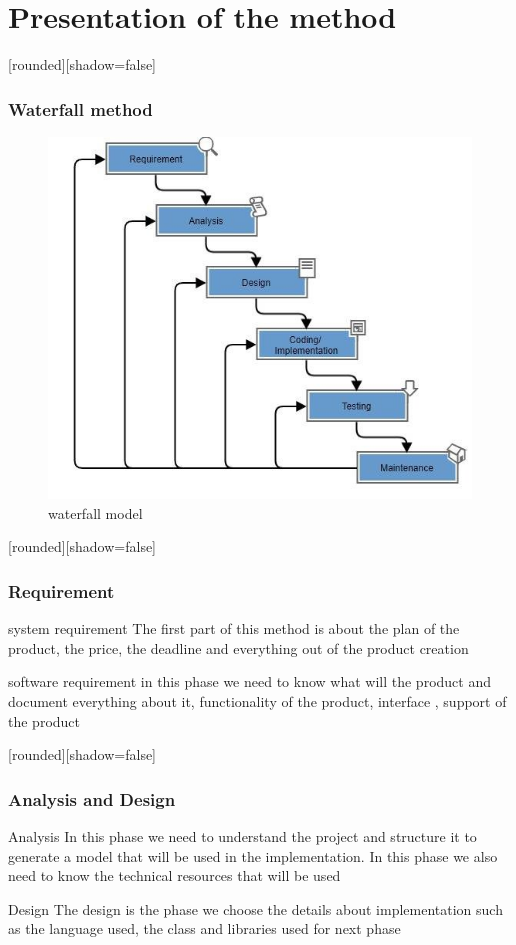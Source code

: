 \documentclass[10pt]{beamer}
\begin{document}
\section{Presentation of the method}
\begin{frame}
[rounded][shadow=false]
\frametitle{Waterfall method}
\begin{figure}
    \centering
    \includegraphics[width=0.5\linewidth]{waterfall method.png}
    \caption{waterfall model}
\end{figure}
\end{frame}
\begin{frame}
[rounded][shadow=false]
\frametitle{Requirement}

\begin{block}{system requirement}
The first part of this method is about the plan of the product, the price, the deadline and everything out of the product creation
\end{block}

\begin{block}{software requirement}
in this phase we need to know what will the product and document everything about it, functionality of the product, interface , support of the product  
\end{block}
\end{frame}
\begin{frame}
[rounded][shadow=false]
\frametitle{Analysis and Design}

\begin{block}{Analysis}
In this phase we need to understand the project and structure it to generate a model that will be used in the implementation. In this phase we also need to know the technical resources that will be used 
\end{block}
\begin{block}{Design}
The design is the phase we choose the details about implementation such as the language used, the class and libraries used for next phase

\end{block}
\end{frame}
\end{document}
